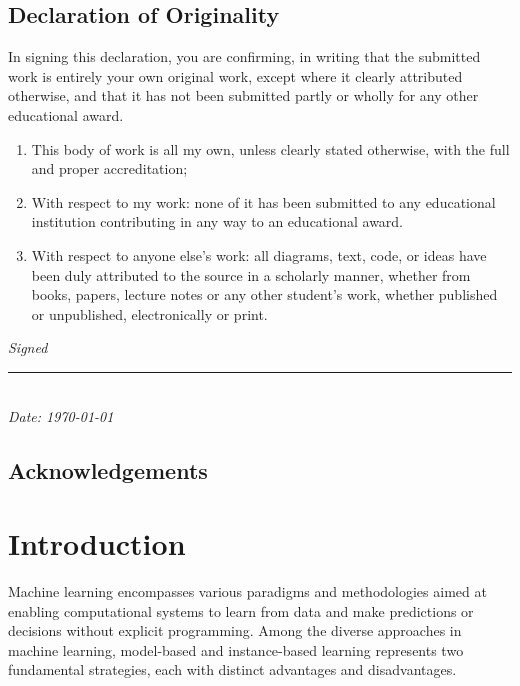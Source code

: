 \documentclass[a4paper, 12pt]{report}
\begin{document}
\section*{Declaration of Originality}
In signing this declaration, you are confirming, in writing that the submitted
work is entirely your own original work, except where it clearly attributed otherwise,
and that it has not been submitted partly or wholly for any other educational award.
\begin{enumerate}
	\item This body of work is all my own, unless clearly stated otherwise, with the full and proper accreditation;
	\item With respect to my work: none of it has been submitted to any educational institution contributing in any way to an educational award.
	\item With respect to anyone else's work: all diagrams, text, code, or ideas have been duly attributed to the source in a scholarly manner,
	      whether from books, papers, lecture notes or any other student's work, whether published or unpublished, electronically or print.
\end{enumerate}

\vspace{2em} %

\begin{flushright}
	\textit{Signed} \\
	\rule{6cm}{0.4pt} \\
	\textit{Date: \today}
\end{flushright}

\section*{Acknowledgements}


\tableofcontents

\listoffigures

\listoftables

\raggedright
\chapter{Introduction}
\label{ch:introduction}

Machine learning encompasses various paradigms and methodologies aimed at enabling computational systems to learn from data and make predictions or decisions without explicit programming.
Among the diverse approaches in machine learning, model-based and instance-based learning represents two fundamental strategies, each with distinct advantages and disadvantages.
\end{document}
